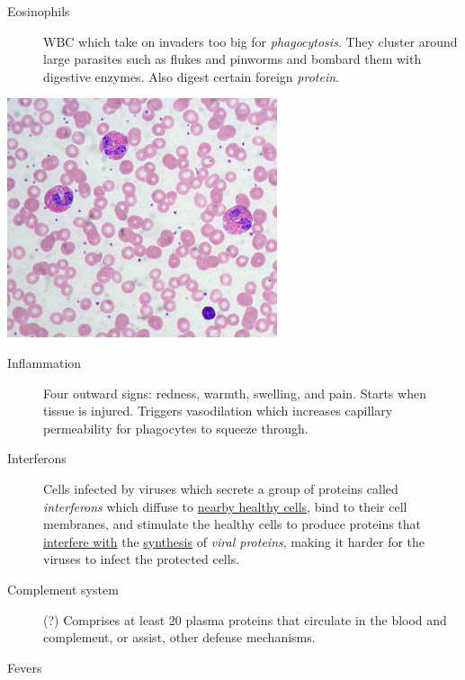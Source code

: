 \documentclass[11pt]{article}
\begin{document}
\begin{description}
\item[{Eosinophils}] WBC which take on invaders too big for \emph{phagocytosis}. They
cluster around large parasites such as flukes and pinworms and bombard them
with digestive enzymes. Also digest certain foreign \emph{protein}.
\end{description}
\begin{center}
\includegraphics[width=.9\linewidth]{Ch. 9/300px-Eosinophils_in_peripheral_blood_2016-11-16_23-16-38.jpg}
\end{center}
\begin{description}
\item[{Inflammation}] Four outward signs: redness, warmth, swelling, and pain.
Starts when tissue is injured. Triggers vasodilation which increases
capillary permeability for phagocytes to squeeze through.
\item[{Interferons}] Cells infected by viruses which secrete a group of proteins
called \emph{interferons} which diffuse to \uline{nearby healthy cells}, bind to their
cell membranes, and stimulate the healthy cells to produce proteins that
\uline{interfere with} the \uline{synthesis} of \emph{viral proteins}, making it harder for the
viruses to infect the protected cells.
\item[{Complement system}] (?) Comprises at least 20 plasma proteins that circulate
in the blood and complement, or assist, other defense mechanisms.
\item[{Fevers}] 
\end{description}
\end{document}
